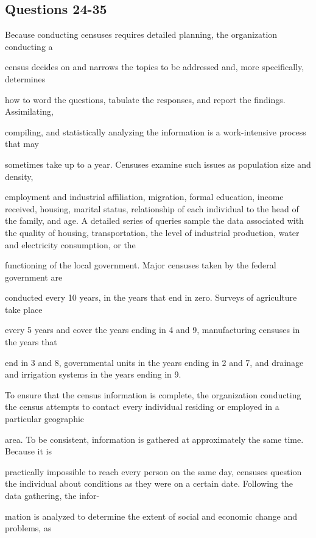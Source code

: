 \documentclass[12pt]{article}
\begin{document}
\subsection*{Questions 24-35}
\begingroup
\small
\sloppy
\setlength{\parskip}{0pt}
\setlength{\parindent}{0pt}
Because conducting censuses requires detailed planning, the organization conducting a\par
census decides on and narrows the topics to be addressed and, more specifically, determines\par
how to word the questions, tabulate the responses, and report the findings. Assimilating,\par
compiling, and statistically analyzing the information is a work-intensive process that may\par
sometimes take up to a year. Censuses examine such issues as population size and density,\par
employment and industrial affiliation, migration, formal education, income received, housing, marital status, relationship of each individual to the head of the family, and age. A detailed series of queries sample the data associated with the quality of housing, transportation, the level of industrial production, water and electricity consumption, or the\par
functioning of the local government. Major censuses taken by the federal government are\par
conducted every 10 years, in the years that end in zero. Surveys of agriculture take place\par
every 5 years and cover the years ending in 4 and 9, manufacturing censuses in the years that\par
end in 3 and 8, governmental units in the years ending in 2 and 7, and drainage and irrigation systems in the years ending in 9.\par
To ensure that the census information is complete, the organization conducting the census attempts to contact every individual residing or employed in a particular geographic\par
area. To be consistent, information is gathered at approximately the same time. Because it is\par
practically impossible to reach every person on the same day, censuses question the individual about conditions as they were on a certain date. Following the data gathering, the infor-\par
mation is analyzed to determine the extent of social and economic change and problems, as\par
\end{document}
